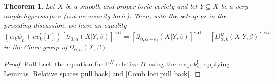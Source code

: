 \documentclass[11pt]{amsart}
\newcommand{\Q}[4]{\overline{\mathcal Q}_{#1,#2}(#3,#4)}
\newcommand{\PP}{\mathbb P}
\newcommand{\virt}[1]{[#1]^{\operatorname{virt}}}
\theoremstyle{plain}
\newtheorem{thm}{Theorem}[section]
\theoremstyle{definition}
\begin{document}
\begin{thm} Let $X$ be a smooth and proper toric variety and let $Y \subseteq X$ be a very ample hypersurface (not necessarily toric). Then, with the set-up as in the preceding discussion, we have an equality
\begin{equation*} (\alpha_k \psi_k + ev_k^* [Y]) \virt{\Q{0}{\alpha}{X|Y}{\beta}} = \virt{\Q{0}{\alpha+e_k}{X|Y}{\beta}} + \virt{D^\mathcal{Q}_{\alpha,k}(X|Y,\beta)} \end{equation*}
in the Chow group of $\Q{0}{n}{X}{\beta}$. \end{thm}
\begin{proof} Pull-back the equation for $\PP^N$ relative $H$ using the map $k_{\text{v}}^!$, applying Lemmas \ref{Relative spaces pull back} and \ref{Comb loci pull back}. \end{proof}








\newpage
\end{document}
